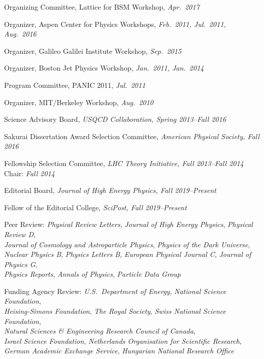 \documentclass[11pt]{article}
\newcommand{\sh}{\phantom{.....}}
\begin{document}
\item Organizing Committee, Lattice for BSM Workshop, \textit{Apr.~2017}
\item Organizer, Aspen Center for Physics Workshops, \textit{Feb.~2011, Jul.~2011, Aug.~2016}
\item Organizer, Galileo Galilei Institute Workshop, \textit{Sep.~2015}
\item Organizer, Boston Jet Physics Workshop, \textit{Jan.~2011, Jan.~2014}
\item Program Committee, PANIC 2011, \textit{Jul.~2011}
\item Organizer, MIT/Berkeley Workshop, \textit{Aug.~2010}
\item Science Advisory Board, \textit{USQCD Collaboration, Spring 2013--Fall 2016}
\item Sakurai Dissertation Award Selection Committee, \textit{American Physical Society, Fall 2016}
\item Fellowship Selection Committee, \textit{LHC Theory Initiative, Fall 2013--Fall 2014}
\\ \sh Chair: \textit{Fall 2014}
\item Editorial Board, \textit{Journal of High Energy Physics, Fall 2019--Present}
\item Fellow of the Editorial College, \textit{SciPost, Fall 2019--Present}
\item Peer Review:  \textit{Physical Review Letters}, \textit{Journal of High Energy Physics}, \textit{Physical Review D},
\\ \sh \textit{Journal of Cosmology and Astroparticle Physics}, \textit{Physics of the Dark Universe},
\\ \sh \textit{Nuclear Physics B}, \textit{Physics Letters B}, \textit{European Physical Journal C}, \textit{Journal of Physics G},
\\ \sh \textit{Physics Reports}, \textit{Annals of Physics}, \textit{Particle Data Group}
\item Funding Agency Review:  \textit{U.S.~Department of Energy},  \textit{National Science Foundation},
\\ \sh \textit{Heising-Simons Foundation}, \textit{The Royal Society}, \textit{Swiss National Science Foundation},
\\ \sh \textit{Natural Sciences \& Engineering Research Council of Canada},
\\ \sh  \textit{Israel Science Foundation}, \textit{Netherlands Organisation for Scientific Research},
\\ \sh \textit{German Academic Exchange Service}, \textit{Hungarian National Research Office}
\end{document}
